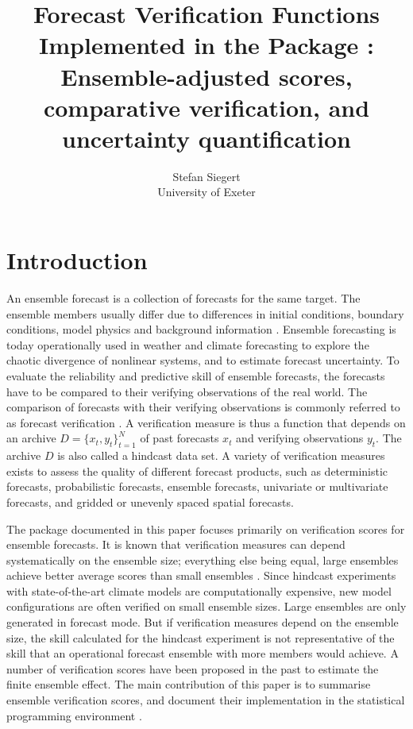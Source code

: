 \documentclass[article]{jss}\usepackage{graphicx, color}
\author{Stefan Siegert\\University of Exeter}
\title{Forecast Verification Functions Implemented in the \proglang{R} Package \pkg{SpecsVerification}: Ensemble-adjusted scores, comparative verification, and uncertainty quantification}
\begin{document}


\section{Introduction}

An ensemble forecast is a collection of forecasts for the same target.
The ensemble members usually differ due to differences in initial conditions, boundary conditions, model physics and background information \citep{gneiting2005atmospheric, leutbecher2008ensemble}.
Ensemble forecasting is today operationally used in weather and climate forecasting to explore the chaotic divergence of nonlinear systems, and to estimate forecast uncertainty.
To evaluate the reliability and predictive skill of ensemble forecasts, the forecasts have to be compared to their verifying observations of the real world.
%
The comparison of forecasts with their verifying observations is commonly referred to as forecast verification \citep{jolliffe2012forecast}.
A verification measure is thus a function that depends on an archive $D=\{x_t, y_t\}_{t=1}^N$ of past forecasts $x_t$ and verifying observations $y_t$.
The archive $D$ is also called a hindcast data set.
A variety of verification measures exists to assess the quality of different forecast products, such as deterministic forecasts, probabilistic forecasts, ensemble forecasts, univariate or multivariate forecasts, and gridded or unevenly spaced spatial forecasts.


The  package  documented in this paper focuses primarily on verification scores for ensemble forecasts.
It is known that verification measures can depend systematically on the ensemble size; everything else being equal, large ensembles achieve better average scores than small ensembles \citep{buizza1998impact}.
Since hindcast experiments with state-of-the-art climate models are computationally expensive, 
new model configurations are often verified on small ensemble sizes.
Large ensembles are only generated in forecast mode.
But if verification measures depend on the ensemble size, the skill calculated for the hindcast experiment is not representative of the skill that an operational forecast ensemble with more members would achieve.
A number of verification scores have been proposed in the past to estimate the finite ensemble effect.
The main contribution of this paper is to summarise ensemble verification scores, and document their implementation in the  statistical programming environment \citep{R2015}.
\end{document}
